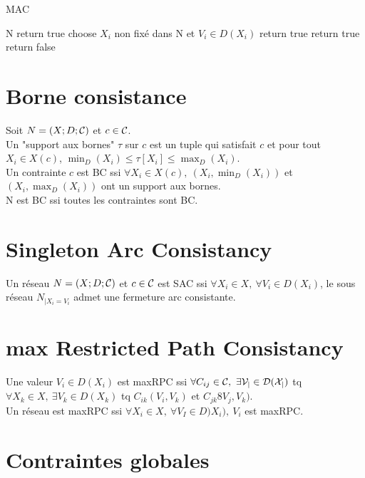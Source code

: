 \documentclass[a4paper,)11pt]{article}
\begin{document}
\begin{algorithm}[!h]
\caption{MAC}
\label{MAC}
\begin{algorithmic}
\REQUIRE N
\STATE return true
\ENDIF
\STATE choose $X_i$ non fixé dans N et $V_i \in D(X_i)$
\STATE return true
\ENDIF
{}
\STATE return true
\ENDIF
\ENDIF
\STATE return false
\end{algorithmic}
\end{algorithm}

\section*{Borne consistance}

Soit $N=(X;D;\cal{C})$ et $c \in \cal{C}$.\\
Un "support aux bornes" $\tau$ sur $c$ est un tuple qui satisfait $c$ et pour tout $X_i \in X(c)$, $\min_D (X_i) \le \tau [X_i] \le \max_D (X_i)$.\\
Un contrainte $c$ est BC ssi $\forall X_i \in X(c),\ (X_i,\min_D(X_i))$ et $(X_i, \max_D(X_i))$ ont un support aux bornes.\\
N est BC ssi toutes les contraintes sont BC.

\section*{Singleton Arc Consistancy}
Un réseau $N=(X;D;\cal{C})$ et $c \in \cal{C}$ est SAC ssi $\forall X_i \in X,\ \forall V_i \in D(X_i)$, le sous réseau $N_{|X_i=V_i}$ admet une fermeture arc consistante.\\

\section*{max Restricted Path Consistancy}
Une valeur $V_i \in D(X_i)$ est maxRPC ssi $\forall C_{ij} \in \cal{C},\ \exists V_j \in D(X_j)$ tq $\forall X_k \in X,\ \exists V_k \in D(X_k)$ tq $C_{ik}(V_i,V_k)$ et $C_{jk}8V_j,V_k)$.\\
Un réseau est maxRPC ssi $\forall X_i \in X,\ \forall V_I \in D)X_i),\ V_i$ est maxRPC.

\section*{Contraintes globales}
\end{document}
